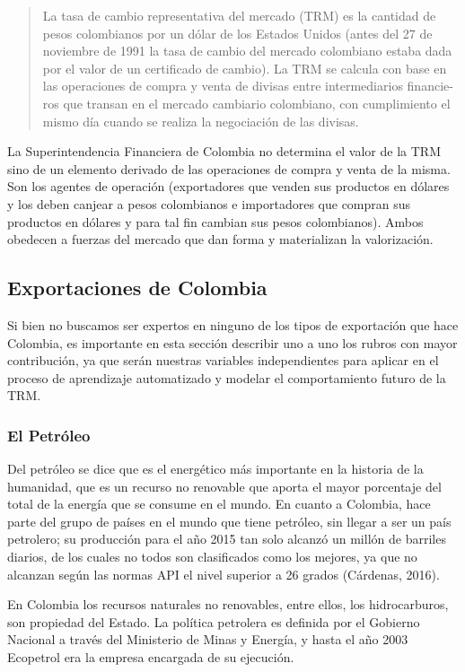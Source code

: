 \begin{spacing}{1.5}
	\begin{quote}La  tasa  de  cambio  representativa  del  mercado  (TRM)  es  la  cantidad de pesos colombianos por un dólar de los Estados Unidos (antes del 27 de noviembre de 1991 la tasa de cambio del mercado colombiano estaba dada por el valor de un certificado de cambio). La TRM se calcula con base en las operaciones de compra y venta de divisas entre intermediarios financie-ros que transan en el mercado cambiario colombiano, con cumplimiento el mismo día cuando se realiza la negociación de las divisas.
	\end{quote}

La Superintendencia Financiera de Colombia no determina el valor de la TRM sino de un elemento derivado de las operaciones de compra y venta de la misma. Son los agentes de operación (exportadores que venden sus productos en dólares y los deben canjear a pesos colombianos e importadores que compran sus productos en dólares y para tal fin cambian sus pesos colombianos). Ambos obedecen a fuerzas del mercado que dan forma y materializan la valorización.

\subsection{Exportaciones de Colombia}
Si bien no buscamos ser expertos en ninguno de los tipos de exportación que hace Colombia, es importante en esta sección describir uno a uno los rubros con mayor contribución, ya que serán nuestras variables independientes para aplicar en el proceso de aprendizaje automatizado y modelar el comportamiento futuro de la TRM. 

\subsubsection{El Petróleo}
Del petróleo se dice que es el energético más importante en la historia de la humanidad, que es un recurso no renovable que aporta el mayor porcentaje del total de la energía que se consume en el mundo. En cuanto a Colombia, hace parte del grupo de países en el mundo que tiene petróleo, sin llegar a ser un país petrolero; su producción para el año 2015 tan solo alcanzó un millón de barriles diarios, de los cuales no todos son clasificados como los mejores, ya que no alcanzan según las normas API el nivel superior a 26 grados (Cárdenas, 2016). 

En Colombia los recursos naturales no renovables, entre ellos, los hidrocarburos, son propiedad del Estado. La política petrolera es definida por el Gobierno Nacional a través del Ministerio de Minas y Energía, y hasta el año 2003 Ecopetrol era la empresa encargada de su ejecución. 


\end{spacing}
